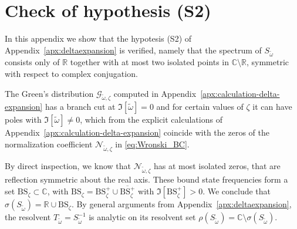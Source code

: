 \documentclass[aps, prd, amsmath, floats, floatfix, twocolumn, nofootinbib, superscriptaddress, showpacs]{revtex4-1}
\def\bC{{\mathbb C}}
\def\BS{\mathrm{BS}}
\def\tomega{{\tilde{\omega}}}
\begin{document}
\section{Check of hypothesis (S2)}
\label{apx:S2}

In this appendix we show that the hypotesis (S2) of Appendix~\ref{apx:deltaexpansion}
is verified, namely that the spectrum of $S_{\tomega}$ consists only of $\mathbb{R}$
together with at most two isolated points in $\mathbb{C}\setminus\mathbb{R}$, 
symmetric with respect to complex conjugation.

The Green's distribution $\mathcal{G}_{\tilde{\omega},\zeta}$ computed 
in Appendix~\ref{apx:calculation-delta-expansion} has a branch cut at $\Im[\tomega]=0$ and for certain values 
of $\zeta$ it can have poles with $\Im[\tomega] \ne 0$,
which from the explicit calculations of Appendix~\ref{apx:calculation-delta-expansion} coincide with
the zeros of the normalization coefficient
$\mathcal{N}_{\tomega,\zeta}$ in \eqref{eq:Wronski_BC}.


By direct inspection, we know that $\mathcal{N}_{\tomega,\zeta}$ has at most isolated 
zeros, that are reflection symmetric about the real axis. These bound state
frequencies form a set $\BS_\zeta \subset \bC$,  with
$\BS_\zeta = \BS_\zeta^+ \cup \overline{\BS_\zeta^+}$ with
$\Im[\BS_\zeta^+] > 0$. We conclude that $\sigma(S_\tomega) =
\mathbb{R} \cup \BS_\zeta$.
By general arguments from Appendix~\ref{apx:deltaexpansion}, the resolvent
$T_{\tomega}=S^{-1}_{\tomega}$ is analytic on its resolvent
set $\rho(S_\tomega) = \bC \setminus \sigma(S_\tomega)$. 
\end{document}
